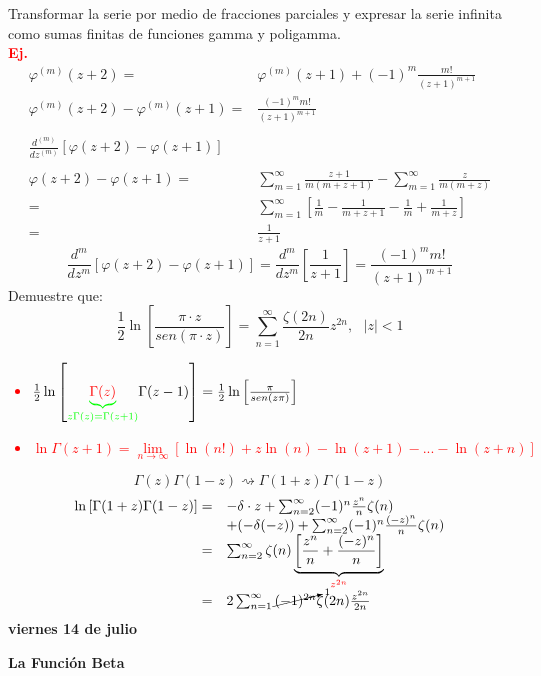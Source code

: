 \documentclass{article}
\theoremstyle{definition}
\begin{document}
Transformar la serie por medio de fracciones parciales y expresar la serie infinita como sumas finitas de funciones gamma y poligamma.\\
\textbf{\textcolor{red}{Ej.}}
\[
\begin{array}{rl}
	\varphi ^{(m)} (z+2)=& \varphi^{(m)} (z+1)+(-1)^{m}\frac{m!}{(z+1)^{m+1}}\\
	\varphi^{(m)} (z+2)-\varphi^{(m)} (z+1)=& \frac{(-1)^mm!}{(z+1)^{m+1}}\\
	\\
	\frac{d^{(m)}}{dz^{(m)}}\left[\varphi (z+2) -\varphi (z+1)\right]\\
	\\
	\varphi (z+2) - \varphi (z+1)=&\sum^{\infty}_{m=1}\frac{z+1}{m(m+z+1)}-\sum^{\infty}_{m=1}\frac{z}{m(m+z)}\\
	=& \sum^{\infty}_{m=1}\left[\frac{1}{m}-\frac{1}{m+z+1}-\frac{1}{m}+\frac{1}{m+z}\right]\\
	=& \frac{1}{z+1}
\end{array}
\]
\[\frac{d^m}{dz^m}\left[\varphi (z+2)-\varphi (z+1)\right] = \frac{d^m}{dz^m}\left[\frac{1}{z+1}\right]=\frac{(-1)^mm!}{(z+1)^{m+1}}\]
Demuestre  que:
\[\frac{1}{2}\ln \left[\frac{\pi\cdot z}{sen(\pi\cdot z)}\right]=\sum^{\infty}_{n=1}\frac{\zeta (2n)}{2n}z^{2n},\ \ \ |z|<1\]
\textcolor{red}{
\begin{itemize}
	\item $\frac{1}{2}\ln\left[\textcolor{green}{\underbrace{\textcolor{red}{\Gamma (z)}}_{z\Gamma (z)=\Gamma (z+1)}}\Gamma (z-1)\right]=\frac{1}{2}\ln\left[\frac{\pi}{sen(z\pi)}\right]$
	\item $\ln \Gamma (z+1) =\lim\limits_{n\to \infty}\left[\ln (n!)+z\ln (n)-\ln (z+1)-...-\ln (z+n)\right]$
\end{itemize}
}
\[\Gamma (z)\Gamma (1-z)\rightsquigarrow\Gamma (1+z)\Gamma (1-z)\]
\[
\begin{array}{rl}
	\ln\left[\Gamma (1+z)\Gamma (1-z)\right]=& -\delta\cdot z +\sum^{\infty}_{n=2}(-1)^n\frac{z^n}{n}\zeta (n)\\
	&+(-\delta(-z))+\sum^{\infty}_{n=2}(-1)^n\frac{(-z)^n}{n}\zeta (n)\\
	=&\sum^{\infty}_{n=2}\zeta (n)\underbrace{\left[\frac{z^n}{n}+\frac{(-z)^n}{n}\right]}_{\textcolor{red}{z^{2n}}}\\
	=& 2\sum^{\infty}_{n=1}\cancelto{1}{(-1)^{2n}}\zeta (2n)\frac{z^{2n}}{2n}
\end{array}
\]
\newpage
\textbf{viernes 14 de julio}

\textbf{La Función Beta}
\end{document}
